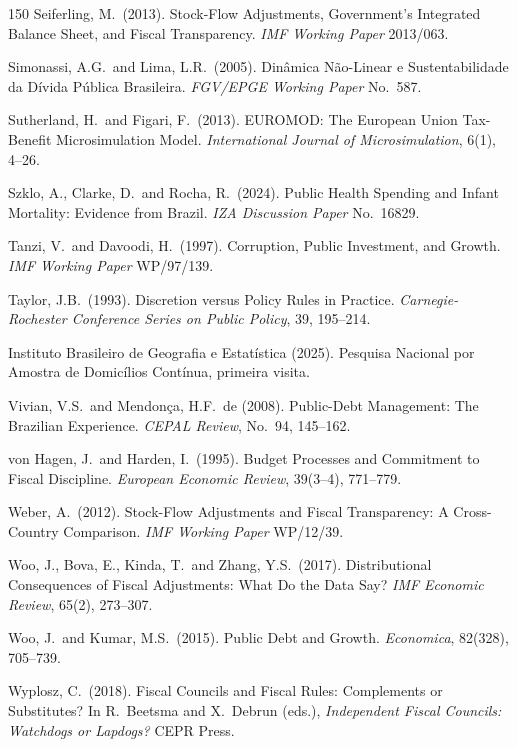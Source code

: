 \documentclass[11pt,a4paper]{article}
\begin{document}
\begin{thebibliography}{150}
 Seiferling, M.\ (2013). Stock-Flow Adjustments, Government's Integrated Balance Sheet, and Fiscal Transparency. \textit{IMF Working Paper} 2013/063.

 Simonassi, A.G.\ and Lima, L.R.\ (2005). Din\^amica N\~ao-Linear e Sustentabilidade da D\'ivida P\'ublica Brasileira. \textit{FGV/EPGE Working Paper} No.\ 587.

 Sutherland, H.\ and Figari, F.\ (2013). EUROMOD: The European Union Tax-Benefit Microsimulation Model. \textit{International Journal of Microsimulation}, 6(1), 4--26.

 Szklo, A., Clarke, D.\ and Rocha, R.\ (2024). Public Health Spending and Infant Mortality: Evidence from Brazil. \textit{IZA Discussion Paper} No.\ 16829.

 Tanzi, V.\ and Davoodi, H.\ (1997). Corruption, Public Investment, and Growth. \textit{IMF Working Paper} WP/97/139.

 Taylor, J.B.\ (1993). Discretion versus Policy Rules in Practice. \textit{Carnegie-Rochester Conference Series on Public Policy}, 39, 195--214.

 Instituto Brasileiro de Geografia e Estat\'istica (2025). Pesquisa Nacional por Amostra de Domic\'ilios Cont\'inua, primeira visita.

 Vivian, V.S.\ and Mendon\c{c}a, H.F.\ de (2008). Public-Debt Management: The Brazilian Experience. \textit{CEPAL Review}, No.\ 94, 145--162.

 von Hagen, J.\ and Harden, I.\ (1995). Budget Processes and Commitment to Fiscal Discipline. \textit{European Economic Review}, 39(3--4), 771--779.

 Weber, A.\ (2012). Stock-Flow Adjustments and Fiscal Transparency: A Cross-Country Comparison. \textit{IMF Working Paper} WP/12/39.

 Woo, J., Bova, E., Kinda, T.\ and Zhang, Y.S.\ (2017). Distributional Consequences of Fiscal Adjustments: What Do the Data Say? \textit{IMF Economic Review}, 65(2), 273--307.

 Woo, J.\ and Kumar, M.S.\ (2015). Public Debt and Growth. \textit{Economica}, 82(328), 705--739.

 Wyplosz, C.\ (2018). Fiscal Councils and Fiscal Rules: Complements or Substitutes? In R.\ Beetsma and X.\ Debrun (eds.), \textit{Independent Fiscal Councils: Watchdogs or Lapdogs?} CEPR Press.

\end{thebibliography}
\end{document}
